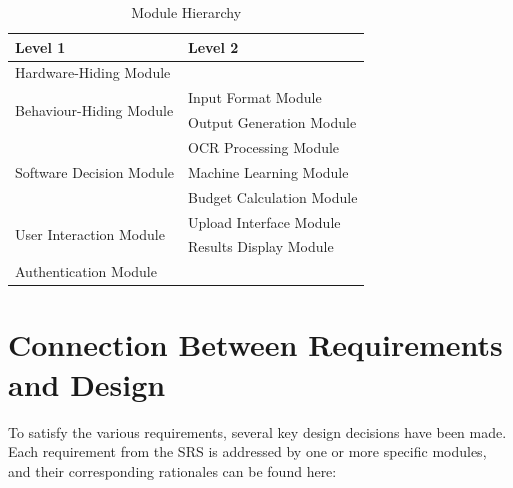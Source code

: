 \documentclass[12pt, titlepage]{article}
\begin{document}
\begin{table}[h!]
\centering
\begin{tabular}{p{} p{}}
\toprule
\textbf{Level 1} & \textbf{Level 2}\\
\midrule

{Hardware-Hiding Module} & ~ \\
\midrule

\multirow{2}{0.3\textwidth}{Behaviour-Hiding Module} & Input Format Module\\
& Output Generation Module\\
\midrule

\multirow{3}{0.3\textwidth}{Software Decision Module} & {OCR Processing Module}\\
& Machine Learning Module\\
& Budget Calculation Module\\
\midrule

\multirow{2}{0.3\textwidth}{User Interaction Module} & {Upload Interface Module}\\
& Results Display Module\\
\midrule

{Authentication Module} & ~ \\
\bottomrule

\end{tabular}
\caption{Module Hierarchy}
\label{TblMH}
\end{table}

\section{Connection Between Requirements and Design} \label{SecConnection}



To satisfy the various requirements, several key design decisions have been made. Each requirement from the SRS is addressed by one or more specific modules, and their corresponding rationales can be found here: \\
\end{document}
